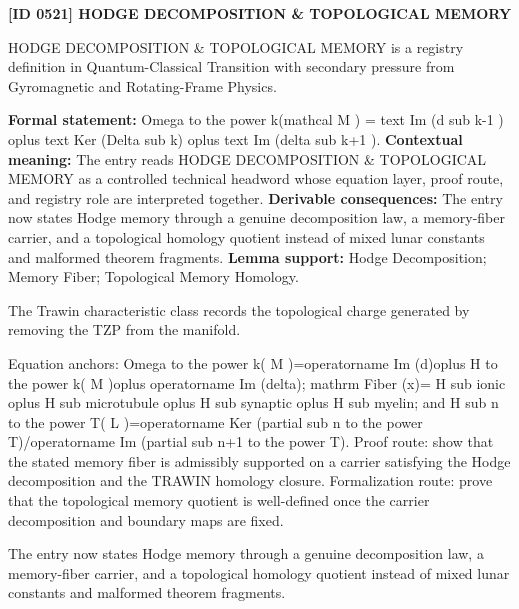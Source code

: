 \clearpage
\noindent\textbf{[ID 0521] HODGE DECOMPOSITION \& TOPOLOGICAL MEMORY}\par
\vspace{0.35em}
\begingroup\small
{}
HODGE DECOMPOSITION \& TOPOLOGICAL MEMORY is a registry definition in Quantum-Classical Transition with secondary pressure from Gyromagnetic and Rotating-Frame Physics.

\begingroup\footnotesize\setlength{\emergencystretch}{3em}\sloppy
\textbf{Formal statement:} Omega to the power k(mathcal M ) = text Im (d sub k-1 ) oplus text Ker (Delta sub k) oplus text Im (delta sub k+1 ). \textbf{Contextual meaning:} The entry reads HODGE DECOMPOSITION \& TOPOLOGICAL MEMORY as a controlled technical headword whose equation layer, proof route, and registry role are interpreted together. \textbf{Derivable consequences:} The entry now states Hodge memory through a genuine decomposition law, a memory-fiber carrier, and a topological homology quotient instead of mixed lunar constants and malformed theorem fragments. \textbf{Lemma support:} Hodge Decomposition; Memory Fiber; Topological Memory Homology.\par
\endgroup

The Trawin characteristic class records the topological charge generated by removing the TZP from the manifold.

Equation anchors: Omega to the power k( M )=operatorname Im (d)oplus H to the power k( M )oplus operatorname Im (delta); mathrm Fiber (x)= H sub ionic oplus H sub microtubule oplus H sub synaptic oplus H sub myelin; and H sub n to the power T( L )=operatorname Ker (partial sub n to the power T)/operatorname Im (partial sub n+1 to the power T). Proof route: show that the stated memory fiber is admissibly supported on a carrier satisfying the Hodge decomposition and the TRAWIN homology closure. Formalization route: prove that the topological memory quotient is well-defined once the carrier decomposition and boundary maps are fixed.

The entry now states Hodge memory through a genuine decomposition law, a memory-fiber carrier, and a topological homology quotient instead of mixed lunar constants and malformed theorem fragments.
\endgroup

